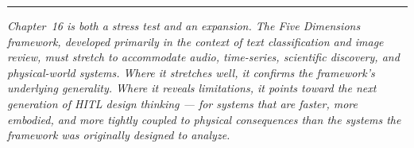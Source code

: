 \bigskip
\begin{center}
\rule{0.5\textwidth}{0.4pt}
\end{center}
\bigskip

\noindent\textit{Chapter~16 is both a stress test and an expansion. The Five Dimensions framework, developed primarily in the context of text classification and image review, must stretch to accommodate audio, time-series, scientific discovery, and physical-world systems. Where it stretches well, it confirms the framework's underlying generality. Where it reveals limitations, it points toward the next generation of HITL design thinking --- for systems that are faster, more embodied, and more tightly coupled to physical consequences than the systems the framework was originally designed to analyze.}

